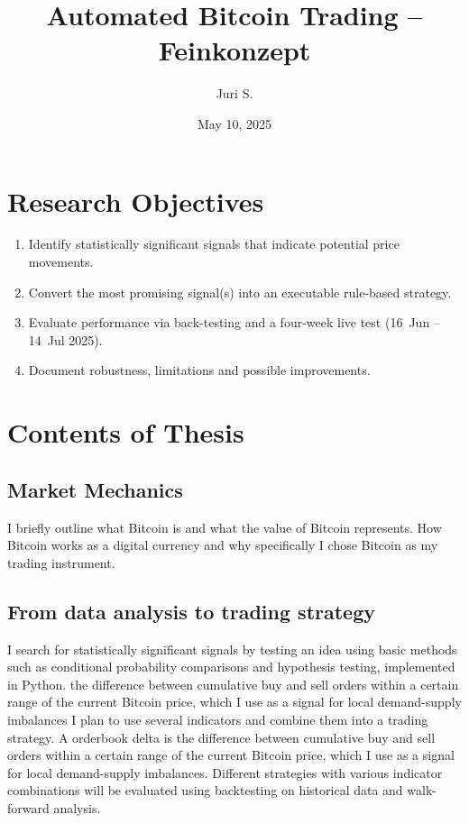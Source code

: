 \documentclass[12pt,a4paper]{article}
\title{Automated Bitcoin Trading – Feinkonzept}
\author{Juri S.}
\date{May 10, 2025}
\begin{document}
\maketitle
\tableofcontents
\newpage

\section{Research Objectives}
\begin{enumerate}
  \item Identify statistically significant signals that indicate potential price movements.
  \item Convert the most promising signal(s) into an executable rule-based strategy.
  \item Evaluate performance via back-testing and a four-week live test (16~Jun – 14~Jul 2025).
  \item Document robustness, limitations and possible improvements.
\end{enumerate}

\section{Contents of Thesis}
\subsection{Market Mechanics}
I briefly outline what Bitcoin is and what the value of Bitcoin represents. How Bitcoin works as a digital currency and why specifically I chose Bitcoin as my trading instrument.


\subsection{From data analysis to trading strategy}
I search for statistically significant signals by testing an idea using basic methods such as conditional probability comparisons and hypothesis testing, implemented in Python. the difference between cumulative buy and sell orders within a certain range of the current Bitcoin price, which I use as a signal for local demand-supply imbalances
I plan to use several indicators and combine them into a trading strategy.  A orderbook delta is the difference between cumulative buy and sell orders within a certain range of the current Bitcoin price, which I use as a signal for local demand-supply imbalances.
Different strategies with various indicator combinations will be evaluated using backtesting on historical data and walk-forward analysis.
\end{document}
